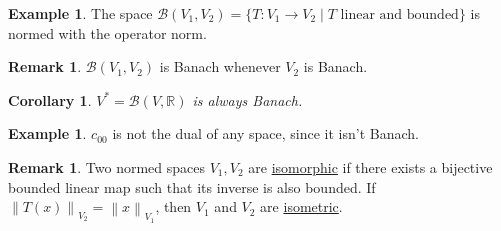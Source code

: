 \documentclass[12pt]{article}
\newcommand{\norm}[1]{\left\| #1 \right\|}
\newcommand{\R}{\mathbb{R}}
\newcommand{\cB}{\mathcal{B}}
\newtheorem{cor}[thm]{Corollary}
\theoremstyle{definition}
\newtheorem{ex}[thm]{Example}
\newtheorem{rmk}[thm]{Remark}
\begin{document}
\begin{ex}
	The space $\cB(V_1, V_2) = \lbrace T : V_1 \to V_2 \mid T \text{ linear and bounded} \rbrace$ is normed with the operator norm.
\end{ex}

\begin{rmk}
	$\cB(V_1,V_2)$ is Banach whenever $V_2$ is Banach.
\end{rmk}

\begin{cor}
	$V^* = \cB(V,\R)$ is always Banach.
\end{cor}

\begin{ex}
	$c_{00}$ is not the dual of any space, since it isn't Banach.
\end{ex}

\begin{rmk}
	Two normed spaces $V_1, V_2$ are \underline{isomorphic} if there exists a bijective bounded linear map such that its inverse is also bounded.
	If $\norm{T(x)}_{V_2} = \norm{x}_{V_1}$, then $V_1$ and $V_2$ are \underline{isometric}.
\end{rmk}
\end{document}
